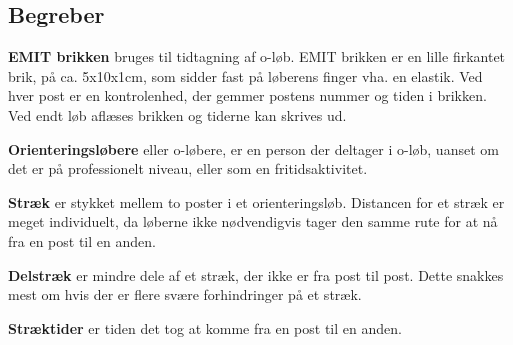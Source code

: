 \subsection{Begreber}

\textbf{EMIT brikken} bruges til tidtagning af o-løb. EMIT brikken er en lille firkantet brik, på ca. 5x10x1cm, som sidder fast på løberens finger vha. en elastik. Ved hver post er en kontrolenhed, der gemmer postens nummer og tiden i brikken. Ved endt løb aflæses brikken og tiderne kan skrives ud.

\textbf{Orienteringsløbere} eller o-løbere, er en person der deltager i o-løb, uanset om det er på professionelt niveau, eller som en fritidsaktivitet.

\textbf{Stræk} er stykket mellem to poster i et orienteringsløb. Distancen for et stræk er meget individuelt, da løberne ikke nødvendigvis tager den samme rute for at nå fra en post til en anden.

\textbf{Delstræk} er mindre dele af et stræk, der ikke er fra post til post. Dette snakkes mest om hvis der er flere svære forhindringer på et stræk.

\textbf{Stræktider} er tiden det tog at komme fra en post til en anden.